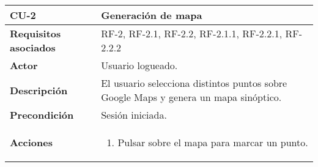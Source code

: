 \begin{longtable}[H]{@{}l|l@{}}
	\toprule
	\begin{minipage}[b]{0.23\columnwidth}\raggedright\strut
		\textbf{CU-2}\strut
	\end{minipage} & \begin{minipage}[b]{0.71\columnwidth}\raggedright\strut
		\textbf{Generación de mapa}\strut
	\end{minipage}\tabularnewline
	\toprule
	\endhead
	\begin{minipage}[t]{0.23\columnwidth}\raggedright\strut
		\textbf{Requisitos asociados}\strut
	\end{minipage} & \begin{minipage}[t]{0.71\columnwidth}\raggedright\strut
		RF-2, RF-2.1, RF-2.2, RF-2.1.1, RF-2.2.1, RF-2.2.2\strut
	\end{minipage}\tabularnewline
	\midrule
	\begin{minipage}[t]{0.23\columnwidth}\raggedright\strut
		\textbf{Actor}\strut
	\end{minipage} & \begin{minipage}[t]{0.71\columnwidth}\raggedright\strut
		Usuario logueado.\strut
	\end{minipage}\tabularnewline
	\midrule
	\begin{minipage}[t]{0.23\columnwidth}\raggedright\strut
		\textbf{Descripción}\strut
	\end{minipage} & \begin{minipage}[t]{0.71\columnwidth}\raggedright\strut
		El usuario selecciona distintos puntos sobre Google Maps y genera un mapa sinóptico.\strut
	\end{minipage}\tabularnewline
	\midrule
	\begin{minipage}[t]{0.23\columnwidth}\raggedright\strut
		\textbf{Precondición}\strut
	\end{minipage} & \begin{minipage}[t]{0.71\columnwidth}\raggedright\strut
		Sesión iniciada.\strut
	\end{minipage}\tabularnewline
	\midrule
	\begin{minipage}[t]{0.23\columnwidth}\raggedright\strut
		\textbf{Acciones}\strut
	\end{minipage} & \begin{minipage}[t]{0.71\columnwidth}\raggedright
		\begin{enumerate}
			\def\labelenumi{\arabic{enumi}.}
			\tightlist
			\item Pulsar sobre el mapa para marcar un punto.

\end{enumerate}
\end{minipage}
\end{longtable}
